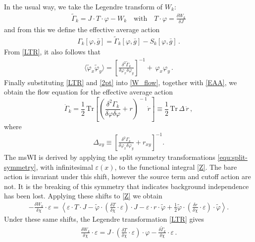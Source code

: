 \documentclass[11pt]{book} %
\numberwithin{equation}{chapter}
\begin{document}
In the usual way, we take the Legendre transform of $W_k$:
\begin{align}
	\tilde\Gamma_{k} = J\cdot T \cdot \varphi - W_k
  \quad \text{with} \quad
  T\cdot\varphi=\frac{\delta W_k}{\delta J}
	\label{LTR}
\end{align}
and from this we define the effective average action
\begin{align}
 	\Gamma_k[\varphi,\bar g]=\tilde\Gamma_k[\varphi,\bar g]-S_k[\varphi,\bar g] \,.
	\label{EAA}
\end{align}
From \eqref{LTR}, it also follows that
\begin{align}
  \langle\tilde\varphi_x \tilde\varphi_y \rangle =
  \left[
    \frac{\delta^{2}\tilde\Gamma_k}{\delta\varphi_x \delta\varphi_y}
  \right]^{-1}
  +\,\varphi_x \varphi_y \,.
  \label{2pt}
\end{align}
Finally substituting \eqref{LTR} and \eqref{2pt} into \eqref{W_flow}, together with \eqref{EAA},
we obtain the flow equation for the effective average action
\begin{equation}
  \dot \Gamma_k = \frac{1}{2} \, \mathrm{Tr}
  \left[
    \left(
      \frac{\delta^{2}\Gamma_k}{\delta\varphi \delta\varphi} +r
    \right)^{\!-1}\dot r
  \right]
	\equiv \frac{1}{2} \, \mathrm{Tr}\,\Delta\, \dot r \,,
	\label{flow1}
\end{equation}
where
\begin{align}
  \Delta_{xy}\equiv\left[\frac{\delta^{2}\Gamma_k}{\delta\varphi_x \delta\varphi_y}+r_{xy}\right]^{-1} .
  \label{new-inverse}
\end{align}
The msWI is derived by applying the  split symmetry transformations \eqref{equ:split-symmetry},
with infinitesimal $\varepsilon(x)$, to the functional integral \eqref{Z}.
The bare action is invariant under this shift, however the source term and cutoff action are not.
It is the breaking of this symmetry that indicates background independence has been lost.
Applying these shifts to \eqref{Z} we obtain
\begin{align}
	-\frac{\delta W_k}{\delta\chi}\cdot\varepsilon=\left< \varepsilon\cdot T\cdot J-
	\tilde\varphi\cdot\left(\frac{\delta T}{\delta\chi}\cdot\varepsilon\right)\cdot J
	- \varepsilon\cdot r\cdot\tilde\varphi
	+\frac{1}{2}\tilde\varphi\cdot\left(\frac{\delta r}{\delta\chi}\cdot\varepsilon\right)\cdot\tilde\varphi\right>.
	\label{Wshift}
\end{align}
Under these same shifts, the Legendre transformation \eqref{LTR} gives
\begin{align}
	\frac{\delta W_k}{\delta\chi}\cdot\varepsilon
	= J\cdot\left(\frac{\delta T}{\delta\chi}\cdot\varepsilon\right)\cdot\varphi
	- \frac{\delta\tilde\Gamma_k}{\delta\chi}\cdot\varepsilon \,.
\end{align}
\end{document}
